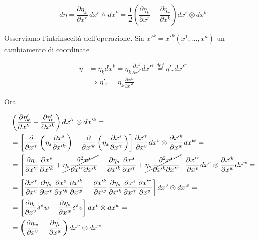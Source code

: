 \begin{equation} \label{eq:poin_cart_2}
  d\eta = \frac{\partial \eta_{k}}{\partial x^r} \, dx^r \wedge dx^k = \frac{1}{2} \left( \frac{\partial \eta_{k}}{\partial x^r} - \frac{\partial \eta_{r}}{\partial x^k} \right) dx^r \otimes dx^k
\end{equation}

Osserviamo l'intrinsecità dell'operazione. Sia $ x'^k = x'^k (x^1, \dots , x^n) $ un cambiamento di coordinate

\begin{equation*}
  \begin{split}
    \eta &= \eta_k dx^k = \eta_k \frac{\partial x^k}{\partial x'^r} dx'^r \overset{def}{=} \eta'_r dx'^r\\
    &\Rightarrow \eta'_r=\eta_k \frac{\partial x^k}{\partial x'^r}
  \end{split}
\end{equation*}

Ora

\begin{equation*}
  \begin{split}
    & \left( \frac{\partial\eta'_k}{\partial x'^r} - \frac{\partial\eta'_r}{\partial x'^k} \right) dx'^r \otimes dx'^k = \\ 
    &= \left[ \frac{\partial}{\partial x'^r} \left( \eta_s \frac{\partial x^s}{\partial x'^k} \right) - \frac{\partial}{\partial x'^k} \left( \eta_s \frac{\partial x^s}{\partial x'^r} \right) \right] \frac{\partial x'^r}{\partial x^v} dx^v \otimes \frac{\partial x'^k}{\partial x^w} dx^w=\\
    &=\left[ \frac{\partial \eta_s}{\partial x'^r} \frac{\partial x^s}{\partial x'^k} + \cancel{\eta_s\frac{\partial ^2 x^s}{\partial x'^r\partial x'^k}} - \frac{\partial \eta_s}{\partial x'^k} \frac{\partial x^s}{\partial x'^r} + \cancel{\eta_s\frac{\partial ^2 x^s}{\partial x'^k\partial x'^r}} \right] \frac{\partial x'^r}{\partial x^v} dx^v \otimes \frac{\partial x'^k}{\partial x^w} dx^w=\\
    &= \left[ \frac{\partial x'^r}{\partial x^v} \frac{\partial \eta_s}{\partial x'^r} \frac{\partial x^s}{\partial x'^k} \frac{\partial x'^k}{\partial x^w} - \frac{\partial x'^k}{\partial x^w} \frac{\partial \eta_s}{\partial x'^k} \frac{\partial x^s}{\partial x'^r} \frac{\partial x'^r}{\partial x^v} \right] dx^v \otimes dx^w=\\
    &= \left[ \frac{\partial \eta_s}{\partial x^v} \delta^s w - \frac{\partial \eta_s}{\partial x^w} \delta^s v \right] dx^v \otimes dx^w = \\
    &= \left( \frac{\partial \eta_w}{\partial x^v} - \frac{\partial \eta_v}{\partial x^w} \right) dx^v \otimes dx^w
  \end{split}
\end{equation*}

